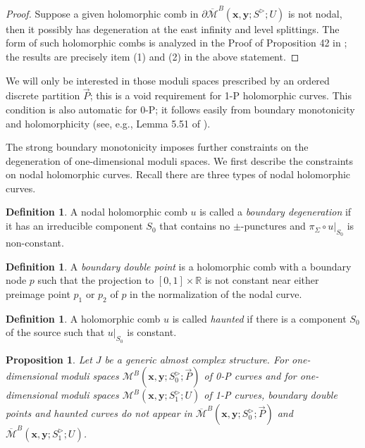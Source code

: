 \documentclass{amsart}
\newtheorem{prop}[thm]{Proposition}
\theoremstyle{definition}
\newtheorem{defn}[thm]{Definition}
\theoremstyle{remark}
\numberwithin{equation}{section}
\numberwithin{equation}{section} \makeatletter
\begin{document}
\begin{proof}
Suppose a given holomorphic comb in $\partial\overline{\mathcal{M}}^{B}(\bm{x},\bm{y};S^{\triangleright};U)$ is not nodal, then it possibly has degeneration at the east infinity and level splittings. The form of such holomorphic combs is analyzed in the Proof of Proposition 42 in \cite{Hanselman2022}; the results are precisely item (1) and (2) in the above statement. 
\end{proof}

We will only be interested in those moduli spaces prescribed by an ordered discrete partition $\overrightarrow{P}$; this is a void requirement for 1-P holomorphic curves. This condition is also automatic for 0-P; it follows easily from boundary monotonicity and holomorphicity (see, e.g., Lemma 5.51 of \cite{LOT18}).

The strong boundary monotonicity imposes further constraints on the degeneration of one-dimensional moduli spaces. We first describe the constraints on nodal holomorphic curves. Recall there are three types of nodal holomorphic curves.

\begin{defn}\label{Definition, boundary degeneration}
A nodal holomorphic comb $u$ is called a \emph{boundary degeneration} if it has an irreducible component $S_0$ that contains no $\pm$-punctures and $\pi_{\Sigma}\circ u|_{S_0}$ is non-constant. 
\end{defn}
\begin{defn}
A \emph{boundary double point} is a holomorphic comb with a boundary node $p$ such that the projection to $[0,1]\times \mathbb{R}$ is not constant near either preimage point $p_1$ or $p_2$ of $p$ in the normalization of the nodal curve.
\end{defn}
\begin{defn}
A holomorphic comb $u$ is called \emph{haunted} if there is a component $S_0$ of the source such that $u|_{S_0}$ is constant.
\end{defn}

\begin{prop}\label{Proposition, no boundary double point or haunted curve}
Let $J$ be a generic almost complex structure. For one-dimensional moduli spaces $\mathcal{M}^B(\bm{x},\bm{y};S_0^\triangleright;\overrightarrow{P})$ of 0-P curves and for one-dimensional moduli spaces $\mathcal{M}^B(\bm{x},\bm{y};S_1^\triangleright;U)$ of 1-P curves, boundary double points and haunted curves do not appear in $\overline{\mathcal{M}}^B(\bm{x},\bm{y};S_0^\triangleright;\overrightarrow{P})$ and $\overline{\mathcal{M}}^B(\bm{x},\bm{y};S_1^\triangleright;U)$.
\end{prop}
\end{document}
